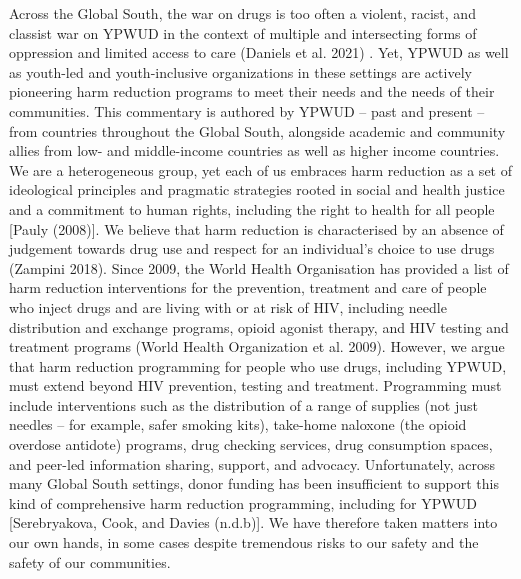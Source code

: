 \documentclass[
  letterpaper,
  DIV=11,
  numbers=noendperiod]{scrartcl}
\begin{document}
Across the Global South, the war on drugs is too often a violent,
racist, and classist war on YPWUD in the context of multiple and
intersecting forms of oppression and limited access to care (Daniels et
al. 2021) . Yet, YPWUD as well as youth-led and youth-inclusive
organizations in these settings are actively pioneering harm reduction
programs to meet their needs and the needs of their communities. This
commentary is authored by YPWUD -- past and present -- from countries
throughout the Global South, alongside academic and community allies
from low- and middle-income countries as well as higher income
countries. We are a heterogeneous group, yet each of us embraces harm
reduction as a set of ideological principles and pragmatic strategies
rooted in social and health justice and a commitment to human rights,
including the right to health for all people {[}Pauly (2008){]}. We
believe that harm reduction is characterised by an absence of judgement
towards drug use and respect for an individual's choice to use drugs
(Zampini 2018). Since 2009, the World Health Organisation has provided a
list of harm reduction interventions for the prevention, treatment and
care of people who inject drugs and are living with or at risk of HIV,
including needle distribution and exchange programs, opioid agonist
therapy, and HIV testing and treatment programs (World Health
Organization et al. 2009). However, we argue that harm reduction
programming for people who use drugs, including YPWUD, must extend
beyond HIV prevention, testing and treatment. Programming must include
interventions such as the distribution of a range of supplies (not just
needles -- for example, safer smoking kits), take-home naloxone (the
opioid overdose antidote) programs, drug checking services, drug
consumption spaces, and peer-led information sharing, support, and
advocacy. Unfortunately, across many Global South settings, donor
funding has been insufficient to support this kind of comprehensive harm
reduction programming, including for YPWUD {[}Serebryakova, Cook, and
Davies (n.d.b){]}. We have therefore taken matters into our own hands,
in some cases despite tremendous risks to our safety and the safety of
our communities.
\end{document}
